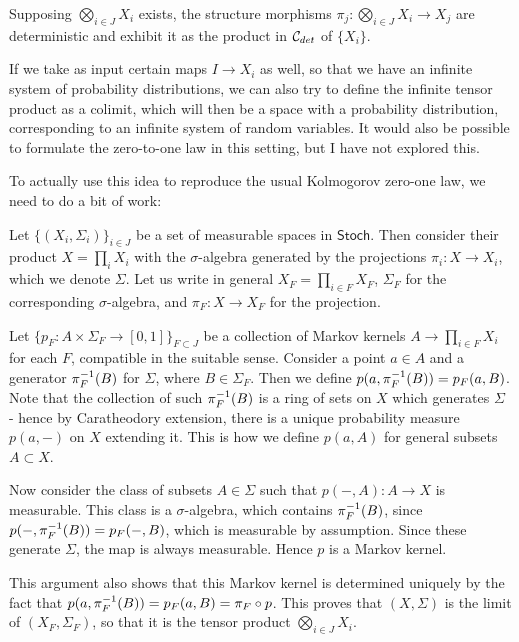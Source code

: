 \documentclass{article}
\renewcommand{\sf}{\mathsf}
\begin{document}
\begin{remark}
    Supposing $\bigotimes_{i\in J}X_i$ exists, the structure morphisms $\pi_j: \bigotimes_{i \in J} X_i \to X_j$ are deterministic and exhibit it as the product in $\mathcal{C}_{det}$ of $\{X_i\}$.
\end{remark}
\begin{remark}
    If we take as input certain maps $I \to X_i$ as well, so that we have an infinite system of probability distributions, we can also try to define the infinite tensor product as a colimit, which will then be a space with a probability distribution, corresponding to an infinite system of random variables.
    It would also be possible to formulate the zero-to-one law in this setting, but I have not explored this.
\end{remark}

To actually use this idea to reproduce the usual Kolmogorov zero-one law, we need to do a bit of work:
\begin{example}
Let $\{(X_i,\Sigma_i)\}_{i\in J}$ be a set of measurable spaces in $\sf{Stoch}$.
Then consider their product $X = \prod_i X_i$ with the $\sigma$-algebra generated by the projections $\pi_i: X \to X_i$, which we denote $\Sigma$.
Let us write in general $X_F = \prod_{i\in F}X_F$, $\Sigma_F$ for the corresponding $\sigma$-algebra, and $\pi_F: X \to X_F$ for the projection.

Let $\{p_F: A \times \Sigma_F \to [0,1]\}_{F \subset J}$ be a collection of Markov kernels $A \to \prod_{i \in F}X_i$ for each $F$, compatible in the suitable sense.
Consider a point $a \in A$ and a generator $\pi_F^{-1}(B)$ for $\Sigma$, where $B \in \Sigma_F$.
Then we define $p(a,\pi_F^{-1}(B)) = p_F(a,B)$.
Note that the collection of such $\pi_F^{-1}(B)$ is a ring of sets on $X$ which generates $\Sigma$ - hence by Caratheodory extension, there is a unique probability measure
$p(a,-)$ on $X$ extending it. This is how we define $p(a,A)$ for general subsets $A \subset X$.

Now consider the class of subsets $A \in \Sigma$ such that $p(-,A):A \to X$ is measurable.
This class is a $\sigma$-algebra, which contains $\pi_F^{-1}(B)$, since $p(-,\pi_F^{-1}(B)) = p_F(-,B)$, which is measurable by assumption.
Since these generate $\Sigma$, the map is always measurable.
Hence $p$ is a Markov kernel.

This argument also shows that this Markov kernel is determined uniquely by the fact that $p(a,\pi_F^{-1}(B)) = p_F(a,B) = \pi_F \circ p$.
This proves that $(X,\Sigma)$ is the limit of $(X_F,\Sigma_F)$, so that it is the tensor product $\bigotimes_{i\in J} X_i$.
\end{example}
\end{document}
